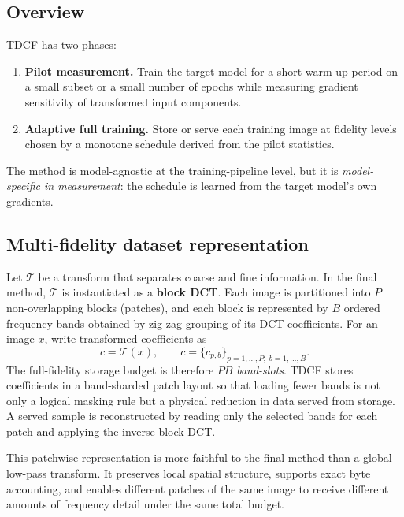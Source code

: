 \documentclass[10pt,twocolumn]{article}
\newcommand{\T}{\mathcal{T}}
\begin{document}
\subsection{Overview}
TDCF has two phases:
\begin{enumerate}
    \item \textbf{Pilot measurement.} Train the target model for a short warm-up period on a small subset or a small number of epochs while measuring gradient sensitivity of transformed input components.
    \item \textbf{Adaptive full training.} Store or serve each training image at fidelity levels chosen by a monotone schedule derived from the pilot statistics.
\end{enumerate}

The method is model-agnostic at the training-pipeline level, but it is \emph{model-specific in measurement}: the schedule is learned from the target model's own gradients.

\subsection{Multi-fidelity dataset representation}
Let $\T$ be a transform that separates coarse and fine information. In the final method, $\T$ is instantiated as a \textbf{block DCT}. Each image is partitioned into $P$ non-overlapping blocks (patches), and each block is represented by $B$ ordered frequency bands obtained by zig-zag grouping of its DCT coefficients. For an image $x$, write transformed coefficients as
\begin{equation}
    c = \T(x), \qquad c = \{c_{p,b}\}_{p=1,\dots,P;\; b=1,\dots,B}.
\end{equation}
The full-fidelity storage budget is therefore $PB$ \emph{band-slots}. TDCF stores coefficients in a band-sharded patch layout so that loading fewer bands is not only a logical masking rule but a physical reduction in data served from storage. A served sample is reconstructed by reading only the selected bands for each patch and applying the inverse block DCT.

This patchwise representation is more faithful to the final method than a global low-pass transform. It preserves local spatial structure, supports exact byte accounting, and enables different patches of the same image to receive different amounts of frequency detail under the same total budget.
\end{document}
